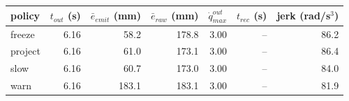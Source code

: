 \begin{tabular}{lrrrrrr}
\toprule
policy & $t_{out}$ (s) & $\bar{e}_{emit}$ (mm) & $\bar{e}_{raw}$ (mm) & $\dot{q}_{max}^{out}$ & $t_{rec}$ (s) & jerk (rad/s$^3$) \\
\midrule
freeze & 6.16 & 58.2 & 178.8 & 3.00 & -- & 86.2 \\
project & 6.16 & 61.0 & 173.1 & 3.00 & -- & 86.4 \\
slow & 6.16 & 60.7 & 173.0 & 3.00 & -- & 84.0 \\
warn & 6.16 & 183.1 & 183.1 & 3.00 & -- & 81.9 \\
\bottomrule
\end{tabular}
